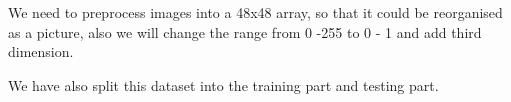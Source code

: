 We need to preprocess images into a 48x48 array, so that it could be reorganised as a picture, also we will change the range from 0 -255 to 0 - 1 and add third dimension.

We have also split this dataset into the training part and testing part.
